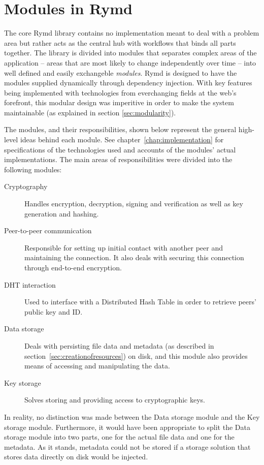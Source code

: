 \section{Modules in Rymd}


The core Rymd library contains no implementation meant to deal with a problem area but rather acts as the central hub with workflows that binds all parts together. The library is divided into modules that separates complex areas of the application – areas that are most likely to change independently over time – into well defined and easily exchangeble \emph{modules}. Rymd is designed to have the modules supplied dynamically through dependency injection. With key features being implemented with technologies from everchanging fields at the web's forefront, this modular design was imperitive in order to make the system maintainable (as explained in section \ref{sec:modularity}).

The modules, and their responsibilities, shown below represent the general high-level ideas behind each module. See chapter~\ref{chap:implementation} for specifications of the technologies used and accounts of the modules' actual implementations. The main areas of responsibilities were divided into the following modules:

\begin{description}
  \item [Cryptography] Handles encryption, decryption, signing and verification as well as key generation and hashing. 
  \item [Peer-to-peer communication] Responsible for setting up initial contact with another peer and maintaining the connection. It also deals with securing this connection through end-to-end encryption.
  \item [DHT interaction] Used to interface with a Distributed Hash Table in order to retrieve peers' public key and ID.
  \item [Data storage] Deals with persisting file data and metadata (as described in section~\ref{sec:creationofresources}) on disk, and this module also provides means of accessing and manipulating the data.
  \item [Key storage] Solves storing and providing access to cryptographic keys.
\end{description}

In reality, no distinction was made between the Data storage module and the Key storage module. Furthermore, it would have been appropriate to split the Data storage module into two parts, one for the actual file data and one for the metadata. As it stands, metadata could not be stored if a storage solution that stores data directly on disk would be injected.


